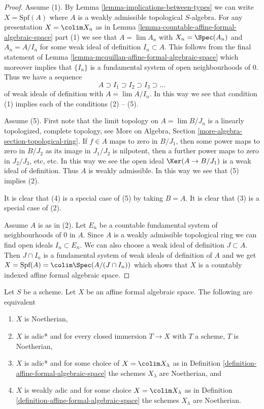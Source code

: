 \begin{proof}
Assume (1). By Lemma \ref{lemma-implications-between-types}
we can write $X = \text{Spf}(A)$ where $A$ is a weakly admissible
topological $S$-algebra. For any presentation $X = \colim X_n$ as in
Lemma \ref{lemma-countable-affine-formal-algebraic-space} part (1)
we see that $A = \lim A_n$ with $X_n = \Spec(A_n)$ and
$A_n = A/I_n$ for some weak ideal of definition $I_n \subset A$.
This follows from the final statement of
Lemma \ref{lemma-mcquillan-affine-formal-algebraic-space}
which moreover implies that $\{I_n\}$ is a fundamental system
of open neighbourhoods of $0$. Thus we have a sequence
$$
A \supset I_1 \supset I_2 \supset I_3 \supset \ldots
$$
of weak ideals of definition with $A = \lim A/I_n$. In this way
we see that condition (1) implies each of the conditions (2) -- (5).

\medskip\noindent
Assume (5). First note that the limit topology on
$A = \lim B/J_n$ is a linearly topologized, complete topology, see
More on Algebra, Section \ref{more-algebra-section-topological-ring}.
If $f \in A$ maps to zero in $B/J_1$, then some power maps to zero
in $B/J_2$ as its image in $J_1/J_2$ is nilpotent, then a further
power maps to zero in $J_2/J_3$, etc, etc. In this way we see
the open ideal $\Ker(A \to B/J_1)$ is a weak ideal of definition.
Thus $A$ is weakly admissible. In this way we see that (5) implies (2).

\medskip\noindent
It is clear that (4) is a special case of (5) by taking $B = A$.
It is clear that (3) is a special case of (2).

\medskip\noindent
Assume $A$ is as in (2). Let $E_n$ be a countable fundamental
system of neighbourhoods of $0$ in $A$. Since $A$ is a weakly
admissible topological ring we can find open ideals $I_n \subset E_n$.
We can also choose a weak ideal of definition $J \subset A$.
Then $J \cap I_n$ is a fundamental system of weak ideals of definition
of $A$ and we get
$X = \text{Spf}(A) = \colim \Spec(A/(J \cap I_n))$
which shows that $X$ is a countably indexed affine formal algebraic space.
\end{proof}

\begin{lemma}
\label{lemma-characterize-noetherian-affine}
Let $S$ be a scheme. Let $X$ be an affine formal algebraic space.
The following are equivalent
\begin{enumerate}
\item $X$ is Noetherian,
\item $X$ is adic* and for every closed immersion $T \to X$ with $T$ a scheme,
$T$ is Noetherian,
\item $X$ is adic* and for some choice of $X = \colim X_\lambda$ as in
Definition \ref{definition-affine-formal-algebraic-space}
the schemes $X_\lambda$ are Noetherian, and
\item $X$ is weakly adic and for some choice $X = \colim X_\lambda$
as in Definition \ref{definition-affine-formal-algebraic-space}
the schemes $X_\lambda$ are Noetherian.
\end{enumerate}
\end{lemma}

